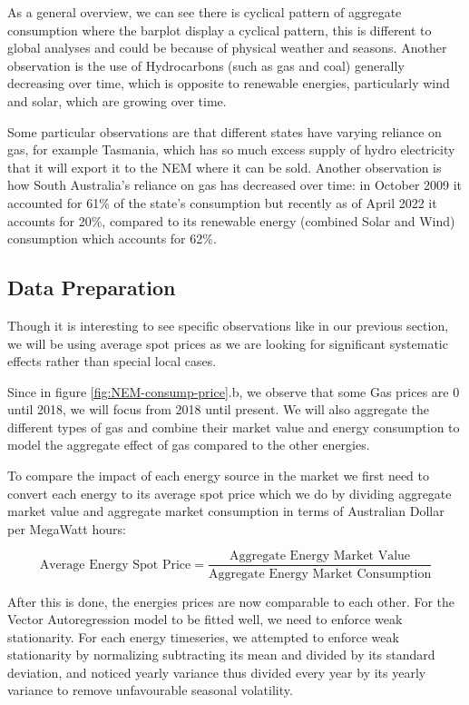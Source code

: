 As a general overview, we can see there is cyclical pattern of aggregate consumption where the barplot display a cyclical pattern, this is different to global analyses and could be because of physical weather and seasons. Another observation is the use of Hydrocarbons (such as gas and coal) generally decreasing over time, which is opposite to renewable energies, particularly wind and solar, which are growing over time.
\medskip

Some particular observations are that different states have varying reliance on gas, for example Tasmania, which has so much excess supply of hydro electricity that it will export it to the NEM where it can be sold. Another observation is how South Australia's reliance on gas has decreased over time: in October 2009 it accounted for 61\% of the state's consumption but recently as of April 2022 it accounts for 20\%, compared to its renewable energy (combined Solar and Wind) consumption which accounts for 62\%.

\subsection{Data Preparation}

Though it is interesting to see specific observations like in our previous section, we will be using average spot prices as we are looking for significant systematic effects rather than special local cases.
\medskip

Since in figure \ref{fig:NEM-consump-price}.b, we observe that some Gas prices are 0 until 2018, we will focus from 2018 until present. We will also aggregate the different types of gas and combine their market value and energy consumption to model the aggregate effect of gas compared to the other energies. 
\medskip

To compare the impact of each energy source in the market we first need to convert each energy to its average spot price which we do by dividing aggregate market value and aggregate market consumption in terms of Australian Dollar per MegaWatt hours: 

\begin{equation*}
    \text{Average Energy Spot Price}=\frac{\text{Aggregate Energy Market Value}}{\text{Aggregate Energy Market Consumption}}
\end{equation*}
\medskip

After this is done, the energies prices are now comparable to each other. For the Vector Autoregression model to be fitted well, we need to enforce weak stationarity. For each energy timeseries, we attempted to enforce weak stationarity by normalizing subtracting its mean and divided by its standard deviation, and noticed yearly variance thus divided every year by its yearly variance to remove unfavourable seasonal volatility.

